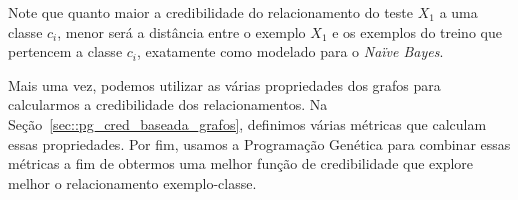 Note que quanto maior a credibilidade do relacionamento do teste $X_1$ a uma classe $c_i$, menor será a distância entre o exemplo $X_1$ e os exemplos do treino que pertencem a classe $c_i$, exatamente como modelado para o \textit{Naïve Bayes}.

Mais uma vez, podemos utilizar as várias propriedades dos grafos para calcularmos a credibilidade dos relacionamentos. Na Seção~\ref{sec::pg_cred_baseada_grafos}, definimos várias métricas que calculam essas propriedades. Por fim, usamos a Programação Genética para combinar essas métricas a fim de obtermos uma melhor função de credibilidade que explore melhor o relacionamento exemplo-classe.

